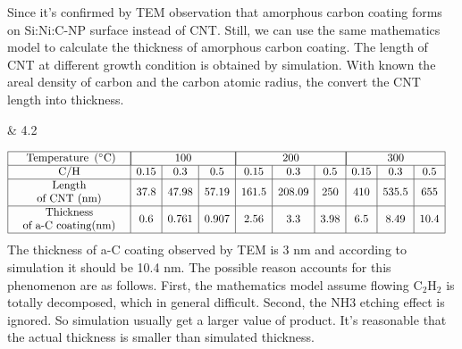 Since it’s confirmed by TEM observation that amorphous carbon coating forms on Si:Ni:C-NP surface instead of CNT. Still, we can use the same mathematics model to calculate the thickness of amorphous carbon coating.  The length of CNT at different growth condition is obtained by simulation. With known the areal density of carbon and the carbon atomic radius, the convert the CNT length into thickness. 
\begin{center}
    & 4.2 
\end{center}
$$
\begin{aligned}
&\begin{array}{|c|c|c|c|c|c|c|c|c|c|}
\hline \text { Temperature }\left({ }^{\circ} \mathrm{C}\right) & \multicolumn{3}{|c|} {100} & \multicolumn{3}{|c|} {200} & \multicolumn{3}{|c|} {300} \\
\hline \text { C/H } & 0.15 & 0.3 & 0.5 & 0.15 & 0.3 & 0.5 & 0.15 & 0.3 & 0.5 \\
\hline \begin{array}{c}
\text { Length } \\
\text { of CNT (nm) }
\end{array} & 37.8 & 47.98 & 57.19 & 161.5 & 208.09 & 250 & 410 & 535.5 & 655 \\
\hline \begin{array}{c}
\text { Thickness } \\
\text { of a-C coating(nm) }
\end{array} & 0.6 & 0.761 & 0.907 & 2.56 & 3.3 & 3.98 & 6.5 & 8.49 & 10.4 \\
\hline
\end{array}
\end{aligned}
$$
 The thickness  of a-C coating observed by TEM is 3 nm and according to simulation it should be 10.4 nm. The possible reason accounts for this phenomenon are as follows. First, the mathematics model assume flowing $\mathrm{C_{2}H_{2}}$ is totally decomposed, which in general difficult. Second,   the NH3  etching effect is ignored. So simulation usually get a larger value of product. It’s reasonable that the actual thickness is smaller than simulated thickness.
 \newpage
